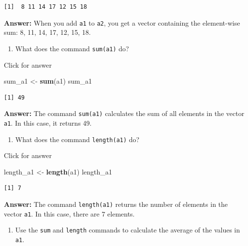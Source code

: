 \documentclass[
]{book}
\newenvironment{Shaded}{\begin{snugshade}}{\end{snugshade}}
\newcommand{\FunctionTok}[1]{\textcolor[rgb]{0.13,0.29,0.53}{\textbf{#1}}}
\newcommand{\NormalTok}[1]{#1}
\newcommand{\OtherTok}[1]{\textcolor[rgb]{0.56,0.35,0.01}{#1}}
\providecommand{\tightlist}{%
  \setlength{\itemsep}{0pt}\setlength{\parskip}{0pt}}
\begin{document}
\begin{verbatim}
[1]  8 11 14 17 12 15 18
\end{verbatim}

\textbf{Answer:} When you add \texttt{a1} to \texttt{a2}, you get a vector containing the element-wise sum: 8, 11, 14, 17, 12, 15, 18.

\begin{enumerate}
\def\labelenumi{\alph{enumi}.}
\setcounter{enumi}{3}
\tightlist
\item
  What does the command \texttt{sum(a1)} do?
\end{enumerate}

Click for answer

\begin{Shaded}
\begin{Highlighting}[]
\NormalTok{sum\_a1 }\OtherTok{\textless{}{-}} \FunctionTok{sum}\NormalTok{(a1)}
\NormalTok{sum\_a1}
\end{Highlighting}
\end{Shaded}

\begin{verbatim}
[1] 49
\end{verbatim}

\textbf{Answer:} The command \texttt{sum(a1)} calculates the sum of all elements in the vector \texttt{a1}. In this case, it returns 49.

\begin{enumerate}
\def\labelenumi{\alph{enumi}.}
\setcounter{enumi}{4}
\tightlist
\item
  What does the command \texttt{length(a1)} do?
\end{enumerate}

Click for answer

\begin{Shaded}
\begin{Highlighting}[]
\NormalTok{length\_a1 }\OtherTok{\textless{}{-}} \FunctionTok{length}\NormalTok{(a1)}
\NormalTok{length\_a1}
\end{Highlighting}
\end{Shaded}

\begin{verbatim}
[1] 7
\end{verbatim}

\textbf{Answer:} The command \texttt{length(a1)} returns the number of elements in the vector \texttt{a1}. In this case, there are 7 elements.

\begin{enumerate}
\def\labelenumi{\alph{enumi}.}
\setcounter{enumi}{5}
\tightlist
\item
  Use the \texttt{sum} and \texttt{length} commands to calculate the average of the values in \texttt{a1}.
\end{enumerate}
\end{document}
